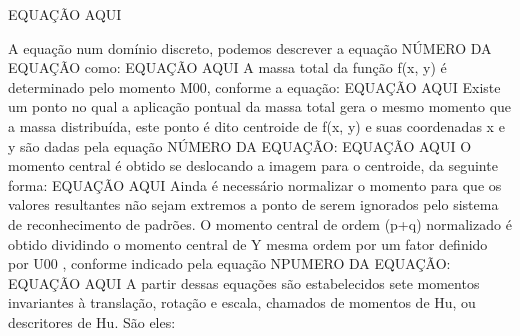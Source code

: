 EQUAÇÃO AQUI

A equação num domínio discreto, podemos descrever a equação NÚMERO DA EQUAÇÃO como:
EQUAÇÃO AQUI
A massa total da função f(x, y) é determinado pelo momento M00, conforme a equação:
EQUAÇÃO AQUI
Existe um ponto no qual a aplicação pontual da massa total gera o mesmo momento que a massa distribuída, este ponto é dito centroide de f(x, y) e suas coordenadas x e y são dadas pela equação NÚMERO DA EQUAÇÃO:
EQUAÇÃO AQUI
O momento central é obtido se deslocando a imagem para o centroide, da seguinte forma:
EQUAÇÃO AQUI
Ainda é necessário normalizar o momento para que os valores resultantes não sejam
 extremos a ponto de serem ignorados pelo sistema de reconhecimento de padrões. O
 momento central de ordem (p+q) normalizado é obtido dividindo o momento central de
 Y mesma ordem por um fator definido por U00 , conforme indicado pela equação NPUMERO DA EQUAÇÃO:
EQUAÇÃO AQUI
A partir dessas equações são estabelecidos sete momentos invariantes à translação,
 rotação e escala, chamados de momentos de Hu, ou descritores de Hu. São eles:

